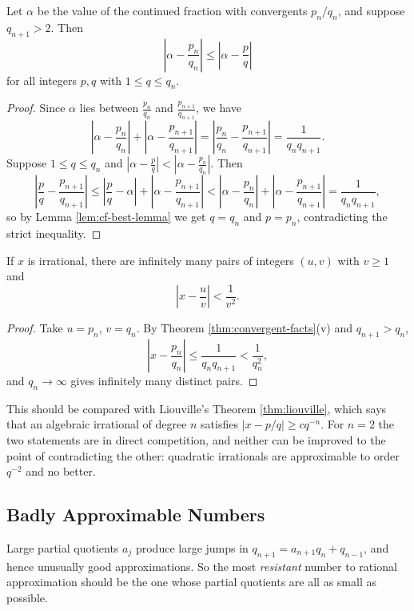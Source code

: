 \begin{theorem}\label{thm:cf-best}
	Let $\alpha$ be the value of the continued fraction with convergents $p_n/q_n$, and suppose $q_{n+1}>2$. Then
	$$\left|\alpha-\frac{p_n}{q_n}\right| \leq \left|\alpha-\frac pq\right|$$
	for all integers $p,q$ with $1\leq q\leq q_n$.
\end{theorem}

\begin{proof}
	Since $\alpha$ lies between $\frac{p_n}{q_n}$ and $\frac{p_{n+1}}{q_{n+1}}$, we have
	$$\left|\alpha-\frac{p_n}{q_n}\right| + \left|\alpha - \frac{p_{n+1}}{q_{n+1}}\right| = \left|\frac{p_n}{q_n}-\frac{p_{n+1}}{q_{n+1}}\right| = \frac{1}{q_nq_{n+1}}.$$
	Suppose $1\leq q \leq q_n$ and $\left|\alpha-\frac pq\right| < \left|\alpha-\frac{p_n}{q_n}\right|$. Then
	$$\left|\frac pq - \frac{p_{n+1}}{q_{n+1}}\right| \leq \left|\frac pq-\alpha\right|+\left|\alpha-\frac{p_{n+1}}{q_{n+1}}\right| < \left|\alpha-\frac{p_n}{q_n}\right|+\left|\alpha-\frac{p_{n+1}}{q_{n+1}}\right| = \frac{1}{q_nq_{n+1}},$$
	so by Lemma \ref{lem:cf-best-lemma} we get $q = q_n$ and $p=p_n$, contradicting the strict inequality.
\end{proof}

\begin{corollary}\label{cor:dirichlet}
	If $x$ is irrational, there are infinitely many pairs of integers $(u,v)$ with $v\geq1$ and
	$$\left|x - \frac uv\right| < \frac{1}{v^2}.$$
\end{corollary}

\begin{proof}
	Take $u=p_n$, $v=q_n$. By Theorem \ref{thm:convergent-facts}(v) and $q_{n+1}>q_n$,
	$$\left|x-\frac{p_n}{q_n}\right|\leq\frac{1}{q_nq_{n+1}}<\frac{1}{q_n^2},$$
	and $q_n\to\infty$ gives infinitely many distinct pairs.
\end{proof}

This should be compared with Liouville's Theorem \ref{thm:liouville}, which says that an algebraic irrational of degree $n$ satisfies $|x-p/q|\geq cq^{-n}$. For $n=2$ the two statements are in direct competition, and neither can be improved to the point of contradicting the other: quadratic irrationals are approximable to order $q^{-2}$ and no better.

\subsection{Badly Approximable Numbers}

Large partial quotients $a_j$ produce large jumps in $q_{n+1}=a_{n+1}q_n+q_{n-1}$, and hence unusually good approximations. So the most \emph{resistant} number to rational approximation should be the one whose partial quotients are all as small as possible.

